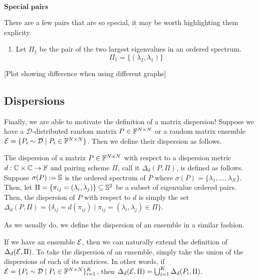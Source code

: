 \begin{center}
$\textbf{Special pairs}$
\end{center}

There are a few pairs that are so special, it may be worth highlighting them explicity.

\begin{enumerate}
  \item Let $\Pi_1$ be the pair of the two largest eigenvalues in an ordered spectrum. 
  $$\Pi_1 = \{(\lambda_2,\lambda_1)\}$$
\end{enumerate}

[Plot showing difference when using different graphs]


\subsection{Dispersions}


Finally, we are able to motivate the definition of a matrix dispersion! Suppose we have a $\mathcal{D}$-distributed random matrix $P \in \F^{N \times N}$ or a random matrix ensemble $\Ens = \{P_i \sim \mathcal{D} \mid P_i \in \F^{N \times N}\}$. Then we define their dispersion as follows. 

\begin{definition}[Dispersion]
The dispersion of a matrix $P \in \F^{N \times N}$ with respect to a dispersion metric $d: \Cc \times \Cc \to \F$ and pairing scheme $\Pi$, call it $\Delta_d(P, \Pi)$, is defined as follows. Suppose $\sigma(P) := \S$ is the ordered spectrum of $P$ where $\sigma(P) = \{\lambda_1, \dots, \lambda_N\}$. Then, let $\Pi = \{\pi_{ij} = (\lambda_i,\lambda_j) \} \subseteq \S^2$ be a subset of eigenvalue ordered pairs. Then, the dispersion of $P$ with respect to $d$ is simply the set $\Delta_d(P, \Pi)=\{\delta_{ij} = d(\pi_{ij}) \mid \pi_{ij} = (\lambda_i,\lambda_j) \in \Pi\}$.
\end{definition}

As we usually do, we define the dispersion of an ensemble in a similar fashion. 

\begin{definition}
If we have an ensemble $\Ens$, then we can naturally extend the definition of $\Delta_d(\Ens, \Pi)$. To take the dispersion of an ensemble, simply take the union of the dispersions of each of its matrices. In other words, if $\Ens = \{P_i \sim \mathcal{D} \mid P_i \in \F^{N \times N}\}_{i = 1}^K$, then $\Delta_d(\Ens, \Pi) = \bigcup_{i=1}^K \Delta_d(P_i, \Pi)$.
\end{definition}

